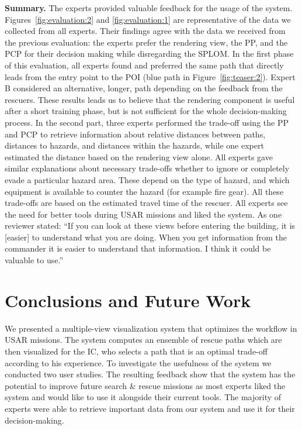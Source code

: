 \documentclass{egpubl}
\begin{document}
%
\textbf{Summary.} The experts provided valuable feedback for the usage of the system. Figures~\ref{fig:evaluation:2} and \ref{fig:evaluation:1} are representative of the data we collected from all experts. Their findings agree with the data we received from the previous evaluation: the experts prefer the rendering view, the PP, and the PCP for their decision making while disregarding the SPLOM. In the first phase of this evaluation, all experts found and preferred the same path that directly leads from the entry point to the POI (blue path in Figure~\ref{fig:teaser:2}). Expert B considered an alternative, longer, path depending on the feedback from the rescuers. These results leads us to believe that the rendering component is useful after a short training phase, but is not sufficient for the whole decision-making process. In the second part, three experts performed the trade-off using the PP and PCP to retrieve information about relative distances between paths, distances to hazards, and distances within the hazards, while one expert estimated the distance based on the rendering view alone. All experts gave similar explanations about necessary trade-offs whether to ignore or completely evade a particular hazard area. These depend on the type of hazard, and which equipment is available to counter the hazard (for example fire gear). All these trade-offs are based on the estimated travel time of the rescuer. All experts see the need for better tools during USAR missions and liked the system. As one reviewer stated: ``If you can look at these views before entering the building, it is [easier] to understand what you are doing. When you get information from the commander it is easier to understand that information. I think it could be valuable to use.''



\section{Conclusions and Future Work} \label{sec:conclusion}
We presented a multiple-view visualization system that optimizes the workflow in USAR missions. The system computes an ensemble of rescue paths which are then visualized for the IC, who selects a path that is an optimal trade-off according to his experience. To investigate the usefulness of the system we conducted two user studies. The resulting feedback show that the system has the potential to improve future search \& rescue missions as most experts liked the system and would like to use it alongside their current tools. The majority of experts were able to retrieve important data from our system and use it for their decision-making.
\end{document}
